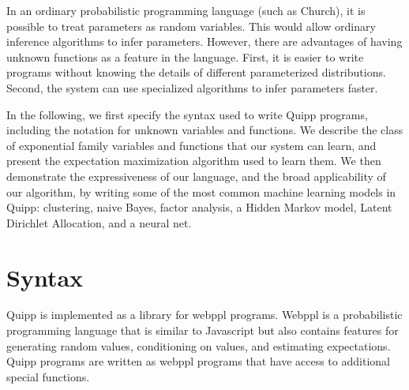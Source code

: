 \documentclass{article}
\begin{document}

  In an ordinary probabilistic programming language (such as Church),
  it is possible to treat parameters as random variables.  This
  would allow ordinary inference algorithms to infer parameters.  However,
  there are advantages of having unknown functions as a feature
  in the language.
  First, it is easier to
  write programs without knowing the details of different parameterized distributions.
  Second, the system can use specialized algorithms to infer parameters faster.



  In the following, we first specify the syntax used to write Quipp programs,
  including the notation for unknown variables and functions.
  We describe the class of exponential family variables and functions that our system can learn,
  and present the expectation maximization algorithm used to learn them.
  We then demonstrate the expressiveness of our language, and the broad
  applicability of our algorithm, by writing some of the most common machine learning models
  in Quipp: clustering, naive Bayes, factor analysis, a Hidden Markov model, Latent Dirichlet Allocation, and
  a neural net.
  
  \section{Syntax}

  Quipp is implemented as a library for webppl programs.  Webppl \cite{dippl} is a probabilistic programming language
  that is similar to Javascript but also contains features for generating random values, conditioning on values,
  and estimating expectations. Quipp programs are written as webppl programs that have access to additional special functions.
\end{document}
